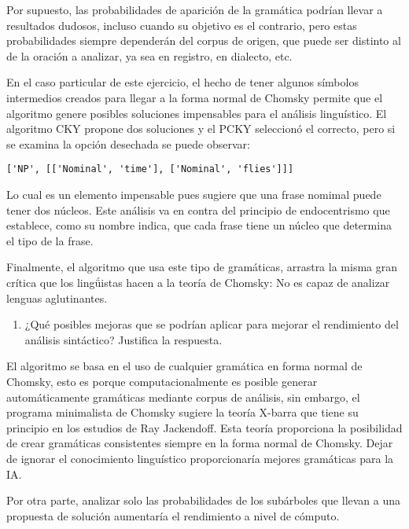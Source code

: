 \documentclass[12pt,a4paper,table]{article}
\providecommand{\tightlist}{%
      \setlength{\itemsep}{0pt}\setlength{\parskip}{0pt}}
\begin{document}
Por supuesto, las probabilidades de aparición de la gramática podrían
llevar a resultados dudosos, incluso cuando su objetivo es el contrario,
pero estas probabilidades siempre dependerán del corpus de origen, que
puede ser distinto al de la oración a analizar, ya sea en registro, en
dialecto, etc.

En el caso particular de este ejercicio, el hecho de tener algunos
símbolos intermedios creados para llegar a la forma normal de Chomsky
permite que el algoritmo genere posibles soluciones impensables para el
análisis linguístico. El algoritmo CKY propone dos soluciones y el PCKY
seleccionó el correcto, pero si se examina la opción desechada se puede
observar:

\begin{verbatim}
['NP', [['Nominal', 'time'], ['Nominal', 'flies']]]
\end{verbatim}

Lo cual es un elemento impensable pues sugiere que una frase nomimal
puede tener dos núcleos. Este análisis va en contra del principio de
endocentrismo que establece, como su nombre indica, que cada frase tiene
un núcleo que determina el tipo de la frase.

Finalmente, el algoritmo que usa este tipo de gramáticas, arrastra la
misma gran crítica que los lingǘistas hacen a la teoría de Chomsky: No
es capaz de analizar lenguas aglutinantes.

\begin{enumerate}
\def\labelenumi{\arabic{enumi}.}
\setcounter{enumi}{2}
\tightlist
\item
  ¿Qué posibles mejoras que se podrían aplicar para mejorar el
  rendimiento del análisis sintáctico? Justifica la respuesta.
\end{enumerate}

El algoritmo se basa en el uso de cualquier gramática en forma normal de
Chomsky, esto es porque computacionalmente es posible generar
automáticamente gramáticas mediante corpus de análisis, sin embargo, el
programa minimalista de Chomsky sugiere la teoría X-barra que tiene su
principio en los estudios de Ray Jackendoff. Esta teoría proporciona la
posibilidad de crear gramáticas consistentes siempre en la forma normal
de Chomsky. Dejar de ignorar el conocimiento linguístico proporcionaría
mejores gramáticas para la IA.

Por otra parte, analizar solo las probabilidades de los subárboles que
llevan a una propuesta de solución aumentaría el rendimiento a nivel de
cómputo.

    
    
    
\end{document}

